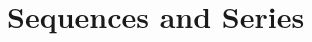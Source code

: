 \newpage

\section[Day 10: Sequences and Series]{Sequences and Series}

































































